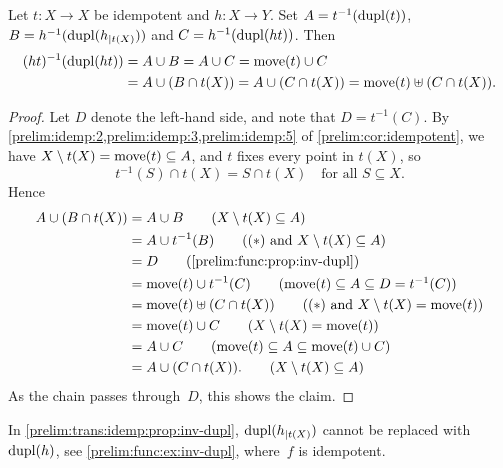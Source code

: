 \begin{proposition}  \label{prelim:trans:idemp:prop:inv-dupl}
	Let $t \colon X \to X$ be idempotent and $h \colon X \to Y$.
	Set $A = t^{-1}(\dupl{t})$, $B = h^{-1}(\dupl{h_{|t(X)}})$ and
	$C = h^{-1}(\dupl{\concat{t}{h}})$. Then
	\begin{align*}
		(\concat{t}{h})^{-1}(\dupl{\concat{t}{h}})
		& = A \cup B = A \cup C = \move{t} \cup C \\
		& = A \cup (B \cap t(X)) = A \cup (C \cap t(X)) = \move{t} \uplus ( C \cap t(X) ).
	\end{align*}
\end{proposition}
\begin{proof}
	Let $D$ denote the left-hand side, and note that $D = t^{-1}(C)$.
	By \cref{prelim:idemp:2,prelim:idemp:3,prelim:idemp:5} of \cref{prelim:cor:idempotent},
	we have $X \setminus t(X) = \move{t} \subseteq A$, and $t$ fixes every point in $t(X)$, so
	\begin{equation*}
		t^{-1}(S) \cap t(X) = S \cap t(X) \quad \text{for all } S \subseteq X. \tag{$\ast$}
	\end{equation*}
	Hence
	\begin{align*}
		A \cup ( B \cap t(X) )
		& = A \cup B \tag{$X \setminus t(X) \subseteq A$} \\
		& = A \cup t^{-1}(B) \tag{$(\ast)$ and $X \setminus t(X) \subseteq A$} \\
		& = D \tag{\cref{prelim:func:prop:inv-dupl}} \\
		& = \move{t} \cup t^{-1}(C) \tag{$\move{t} \subseteq A \subseteq D = t^{-1}(C)$} \\
		& = \move{t} \uplus ( C \cap t(X) ) \tag{$(\ast)$ and $X \setminus t(X) = \move{t}$} \\
		& = \move{t} \cup C \tag{$X \setminus t(X) = \move{t}$} \\
		& = A \cup C \tag{$\move{t} \subseteq A \subseteq \move{t} \cup C$} \\
		& = A \cup ( C \cap t(X) ). \tag{$X \setminus t(X) \subseteq A$}
	\end{align*}
	As the chain passes through~$D$, this shows the claim.
\end{proof}

In \cref{prelim:trans:idemp:prop:inv-dupl}, $\dupl{h_{|t(X)}}$ cannot be
replaced with $\dupl{h}$, see \cref{prelim:func:ex:inv-dupl}, where~$f$ is idempotent.

